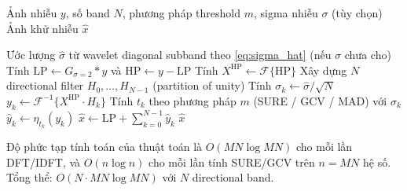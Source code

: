 \begin{algorithm}[H]
\caption{DFB Image Denoising}
\label{alg:dfb_denoise}
\begin{algorithmic}[1]
\Require Ảnh nhiễu $y$, số band $N$, phương pháp threshold $m$, sigma nhiễu $\sigma$ (tùy chọn)
\Ensure Ảnh khử nhiễu $\hat{x}$

\State Ước lượng $\hat{\sigma}$ từ wavelet diagonal subband theo \eqref{eq:sigma_hat} (nếu $\sigma$ chưa cho)
\State Tính $\text{LP} \gets G_{\sigma=2} * y$ và $\text{HP} \gets y - \text{LP}$
\State Tính $X^{\text{HP}} \gets \mathcal{F}\{\text{HP}\}$ 
\State Xây dựng $N$ directional filter $H_0, \ldots, H_{N-1}$ (partition of unity)
\State Tính $\sigma_k \gets \hat{\sigma} / \sqrt{N}$ 
    \State $y_k \gets \mathcal{F}^{-1}\{X^{\text{HP}} \cdot H_k\}$ 
    \State Tính $t_k$ theo phương pháp $m$ (SURE / GCV / MAD) với $\sigma_k$
    \State $\hat{y}_k \gets \eta_{t_k}(y_k)$ 
\EndFor
\State $\hat{x} \gets \text{LP} + \sum_{k=0}^{N-1} \hat{y}_k$
\Return $\hat{x}$
\end{algorithmic}
\end{algorithm}

Độ phức tạp tính toán của thuật toán là $O(MN \log MN)$ cho mỗi lần DFT/IDFT, và $O(n \log n)$ cho mỗi lần tính SURE/GCV trên $n = MN$ hệ số. Tổng thể: $O(N \cdot MN \log MN)$ với $N$ directional band.
